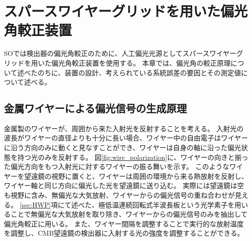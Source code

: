 \documentclass[../../main.tex]{subfiles}
\begin{document}
\chapter{スパースワイヤーグリッドを用いた偏光角較正装置}
\label{chap:wiregrid}
SOでは検出器の偏光角較正のために、人工偏光光源としてスパースワイヤーグリッドを用いた偏光角較正装置を使用する\cite{Tajima_2012}\cite{swg:Murata_2023}。
本章では、偏光角の較正原理について述べたのちに、装置の設計、考えられている系統誤差の要因とその測定値について述べる。

\section{金属ワイヤーによる偏光信号の生成原理}
\label{sec:wiregrid_principle}
金属製のワイヤーが、周囲から来た入射光を反射することを考える。
入射光の波長がワイヤーの直径よりも十分に長い場合、ワイヤー中の自由電子はワイヤーに沿う方向のみに動くと見なすことができ、ワイヤーは自身の軸に沿った偏光状態を持つ光のみを反射する。
図\ref{fig:wire_polarization}に、ワイヤーの向きと揃った偏光方向をもつ入射光に対するワイヤーの振る舞いを示す。
このようなワイヤーを望遠鏡の視野に置くと、ワイヤーは周囲の環境から来る熱放射を反射し、ワイヤー軸と同じ方向に偏光した光を望遠鏡に送り込む。
実際には望遠鏡は空も視野に含み、無偏光な大気放射、ワイヤーからの偏光信号の重ね合わせが見える。
\ref{sec:HWP}項にて述べた、極低温連続回転式半波長板という光学素子を用いることで無偏光な大気放射を取り除き、ワイヤーからの偏光信号のみを抽出して偏光角較正に用いる。
また、ワイヤー間隔を調整することで実行的な放射温度を調整し、CMB望遠鏡の検出器に入射する光の強度を調整することができる。
\end{document}
